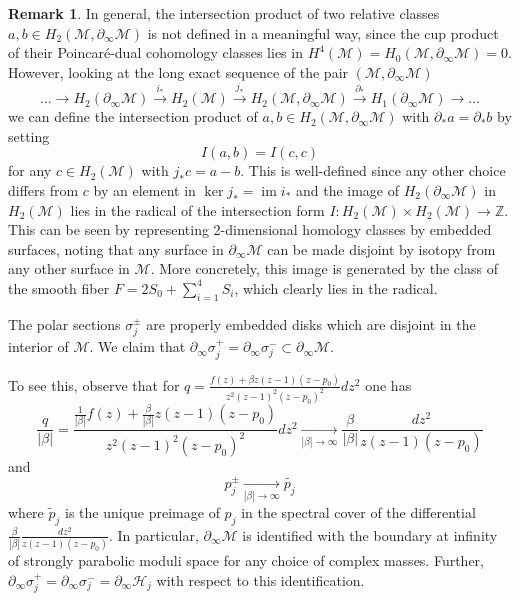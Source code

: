 \documentclass[12pt,letterpaper,reqno]{amsart}
\theoremstyle{remark}
\theoremstyle{definition}
\newtheorem{rem}[thm]{Remark}
\numberwithin{thm}{section}
\numberwithin{equation}{section}
\numberwithin{figure}{section}
\newcommand{\Z}{\ensuremath{\mathbb Z}}
\newcommand{\calM}{\mathcal M}
\DeclareMathOperator{\image}{im}
\begin{document}
\begin{rem}
In general, the intersection product of two relative classes $a, b \in H_2(\calM, \partial_\infty\calM)$ is not defined in a meaningful way, since the cup product of their Poincar\'e-dual cohomology classes lies in $H^4(\calM)= H_0(\calM, \partial_\infty \calM)  = 0$. However, looking at the long exact sequence of the pair $(\mathcal M, \partial_\infty \mathcal M)$
\[
\ldots  \to H_2(\partial_\infty \mathcal M)\overset{i_*}{\longrightarrow} H_2(\mathcal M) \overset{j_*}{\longrightarrow} H_2(\mathcal M, \partial_\infty \mathcal M) \overset{\partial_*}{\longrightarrow} H_1(\partial_\infty \mathcal M)  \to \ldots
\]
we can define the intersection product of  $a, b \in H_2(\calM,\partial_\infty\calM)$ with $\partial_* a = \partial_*b$ by setting
\[
I(a,b) = I(c,c)
\]
for any $c \in H_2(\calM)$ with $j_* c = a-b$. This is well-defined since any other choice differs from $c$ by an element in $\ker j_* =  \image i_*$ and the image of $H_2(\partial_\infty \mathcal M)$ in $H_2(\mathcal M)$ lies in the radical of the intersection form $I : H_2(\mathcal M) \times H_2(\mathcal M) \to \Z$. This can be seen by representing 2-dimensional homology classes by embedded surfaces, noting that any surface in $\partial_\infty \calM$ can be made disjoint by isotopy from any other surface in $\calM$. More concretely, this image is generated by the class of the smooth fiber $F=2S_0 + \sum_{i=1}^4 S_i$, which clearly lies in the radical. 
\end{rem}




The polar sections $\sigma_j^\pm$ are properly embedded disks which are disjoint in the interior of $\calM$. We claim that $\partial_\infty \sigma_j^+ = \partial_\infty\sigma_j^- \subset \partial_\infty \calM$. 

To see this, observe that for $q= \frac{f(z) + \beta z(z-1)(z-p_0)}{z^2(z-1)^2(z-p_0)^2} dz^2$  one has 
\[
\frac{q}{|\beta|} = \frac{\frac{1}{|\beta|}f(z) + \frac{\beta} {|\beta|}z(z-1)(z-p_0)}{z^2(z-1)^2(z-p_0)^2}dz^2 \underset{|\beta|\to \infty}{\longrightarrow} \frac{\beta} {|\beta|}\frac{dz^2}{z(z-1)(z-p_0)}
\]
and 
\[
p_j^\pm \underset{|\beta|\to \infty}{\longrightarrow}  \tilde{p_j}
\]
where $\tilde p_j$ is the unique preimage of $p_j$ in the spectral cover of the differential $\frac{\beta} {|\beta|}\frac{dz^2}{z(z-1)(z-p_0)}$. In particular, $\partial_\infty \calM$ is identified with the boundary at infinity of strongly parabolic moduli space for any choice of complex masses. Further, $\partial_\infty \sigma_j^+ = \partial_\infty\sigma_j^-  = \partial_\infty \mathcal{H}_j$ with respect to this identification. 
\end{document}
